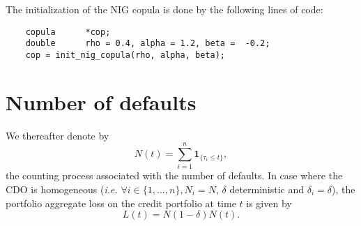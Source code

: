 \documentclass[10pt, a4paper]{article}
\begin{document}
The initialization of the NIG copula is done by the following lines of code:
\begin{lstlisting}
    copula      *cop;
    double      rho = 0.4, alpha = 1.2, beta =  -0.2;
    cop = init_nig_copula(rho, alpha, beta);
\end{lstlisting}

\section{Number of defaults}
We thereafter denote by 
\begin{equation*}
    N(t) = \sum_{i=1}^n \mathbf{1}_{\{\tau_i \le t\}},
\end{equation*}
the counting process associated with the number of defaults. In case where the CDO is homogeneous (\emph{i.e.} $\forall i \in \{1,\dots,n\}, N_i = N$, $\delta$ deterministic and $\delta_i = \delta$), the portfolio aggregate loss on the credit portfolio at time $t$ is given by
\begin{equation*}
    L(t) = N (1 - \delta) N(t). 
\end{equation*}
\end{document}

